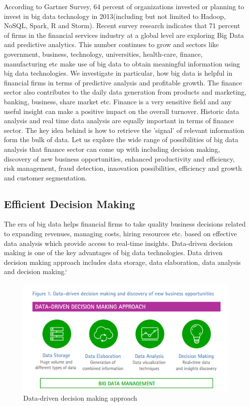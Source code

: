 \documentclass[sigconf]{acmart}
\begin{document}
According to Gartner Survey, 64 percent of organizations invested or planning to invest in big data technology in 2013(including but not limited to Hadoop, NoSQL, Spark, R and Storm)\cite{gartner-survey}. Recent survey research indicates that 71 percent of firms in the financial services
industry at a global level are exploring Big
Data and predictive analytics\cite{accenture-next-generation-financial}. This number continues to grow and sectors like government, business, technology, universities, health-care, finance, manufacturing etc make use of big data to obtain meaningful information using big data technologies\cite{wiki-bigdata}. We investigate in particular, how big data is helpful in financial firms in terms of predictive analysis and profitable growth. The finance sector also contributes to the daily data generation from products and marketing, banking, business, share market etc. Finance is a very sensitive field and any useful insight can make a positive impact on the overall turnover. Historic data analysis and real time data analysis are equally important in terms of finance sector. The key idea behind is how to retrieve the 'signal' of relevant information form the bulk of data. Let us explore the wide range of possibilities of big data analysis that finance sector can come up with including decision making, discovery of new business opportunities, enhanced productivity and efficiency, risk management, fraud detection, innovation possibilities, efficiency and growth and customer segmentation.

\subsection{Efficient Decision Making}

The era of big data helps financial firms to take quality business decisions related to expanding revenues, managing costs, hiring resources etc. based on effective data analysis which provide access to real-time insights.  Data-driven decision making is one of the key advantages of big data technologies. Data driven decision making approach includes data storage, data elaboration, data analysis and decision making\cite{accenture-next-generation-financial}.`

\begin{figure}[htb]
  \centering
  \includegraphics[width=1.0\columnwidth]{images/Figure1.png}
  \caption{Data-driven decision making approach 
  \cite{accenture-next-generation-financial}}
  \label{fig:Figure1} 
\end{figure}
\end{document}
